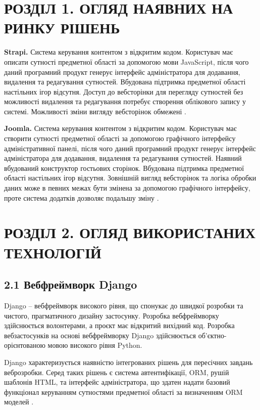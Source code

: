\documentclass[a4paper, 14pt]{extarticle}
\begin{document}
  \clearpage
  \section{РОЗДІЛ 1. ОГЛЯД НАЯВНИХ НА РИНКУ РІШЕНЬ}
  \textbf{Strapi.} Система керування контентом з відкритим кодом.
  Користувач має описати сутності предметної області за допомогою мови JavaScript, після
  чого даний програмний продукт генерує інтерфейс адміністратора для додавання, видалення
  та редагування сутностей. Вбудована підтримка предметної області настільних ігор
  відсутня. Доступ до вебсторінки для перегляду сутностей без можливості видалення та
  редагування потребує створення облікового запису у системі. Можливості зміни вигляду
  вебсторінок обмежені \cite{strapi}.

  \textbf{Joomla.} Система керування контентом з відкритим кодом.
  Користувач має створити сутності предметної області за допомогою графічного
  інтерфейсу адміністративної панелі, після
  чого даний програмний продукт генерує інтерфейс адміністратора для додавання, видалення
  та редагування сутностей. Наявний вбудований конструктор гостьових сторінок.
  Вбудована підтримка предметної області настільних ігор відсутня. Зовнішній вигляд
  вебсторінок та логіка обробки даних може в певних межах бути змінена за допомогою
  графічного інтерфейсу, проте система додатків дозволяє подальшу зміну \cite{joomla}.


  \clearpage
  \section{РОЗДІЛ 2. ОГЛЯД ВИКОРИСТАНИХ ТЕХНОЛОГІЙ}

  \subsection{2.1 Вебфреймворк Django}
  Django -- вебфреймворк високого рівня, що спонукає до швидкої розробки та чистого,
  прагматичного дизайну застосунку. Розробка вебфреймворку здійснюється волонтерами,
  а проєкт має відкритий вихідний код. Розробка вебзастосунків на основі
  вебфреймворку Django здійснюється об'єктно-орієнтованою мовою високого рівня Python.

  Django характеризується наявністю інтегрованих рішень для пересічних завдань
  веброзробки. Серед таких рішень є система автентифікації, ORM, рушій шаблонів HTML,
  та інтерфейс адміністратора, що здатен надати базовий функціонал керуванням
  сутностями предметної області за визначенням ORM моделей \cite{django}.
\end{document}
